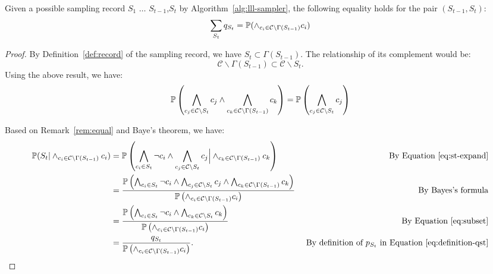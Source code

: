 \begin{lemma} \label{eq:pair-prob}
Given a possible sampling record $S_1$ $\ldots$ $S_{t-1}$,$S_t$ by Algorithm~\ref{alg:lll-sampler}, the following equality holds for the pair $(S_{t-1},S_t)$:
\begin{equation*}
\sum_{S_t}q_{S_t}=\mathbb{P}(\wedge_{c_i \in \mathcal{C}\backslash \Gamma(S_{t-1})}c_i)
\end{equation*}
\begin{proof}
By Definition~\ref{def:record} of the sampling record, we have $S_t \subset \Gamma(S_{t-1})$. The  relationship of its complement would be:
\begin{equation*}
\mathcal{C}\backslash\Gamma(S_{t-1})\subset \mathcal{C}\backslash S_t.
\end{equation*}
Using the above result, we have:
\begin{equation}\label{eq:subset}
\mathbb{P}\left(\bigwedge_{c_j \in \mathcal{C}\backslash S_t}c_j \wedge \bigwedge_{c_k \in \mathcal{C}\backslash \Gamma(S_{t-1})}c_k \right)=
\mathbb{P}\left(\bigwedge_{c_j \in \mathcal{C}\backslash S_t}c_j \right)
\end{equation}

Based on Remark~\ref{rem:equal} and Baye's theorem, we have:
\begin{equation} \label{eq:bayes}
\begin{aligned}
\mathbb{P}(S_t |\wedge_{c_i \in \mathcal{C}\backslash \Gamma(S_{t-1})}c_i)&=\mathbb{P}\left(\bigwedge_{c_i \in S_t}\neg{c}_i \wedge \bigwedge_{c_j \in \mathcal{C}\backslash S_t}c_j \Big| \wedge_{c_k \in \mathcal{C}\backslash \Gamma(S_{t-1})}c_k \right) & \text{ By Equation~\eqref{eq:st-expand}}\\
&=\frac{\mathbb{P}\left(\bigwedge_{c_i \in S_t}\neg{c}_i \wedge \bigwedge_{c_j \in \mathcal{C}\backslash S_t}c_j \wedge \bigwedge_{c_k \in \mathcal{C}\backslash \Gamma(S_{t-1})}c_k \right)}{\mathbb{P} \left(\wedge_{c_i \in \mathcal{C}\backslash \Gamma(S_{t-1})}c_i\right) } &\text{By Bayes's formula}\\
&=\frac{\mathbb{P}\left(\bigwedge_{c_i \in S_t}\neg{c}_i \wedge \bigwedge_{c_k \in \mathcal{C}\backslash S_{t}}c_k \right)}{\mathbb{P} \left(\wedge_{c_i \in \mathcal{C}\backslash \Gamma(S_{t-1})}c_i\right) } &\text{ By Equation~\eqref{eq:subset}}\\
&= \frac{q_{S_t} }{\mathbb{P} \left(\wedge_{c_i \in \mathcal{C}\backslash \Gamma(S_{t-1})}c_i\right) }. &\text{ By definition of $p_{S_t}$ in Equation~\eqref{eq:definition-qst}}
\end{aligned}
\end{equation}


\end{proof}
\end{lemma}
